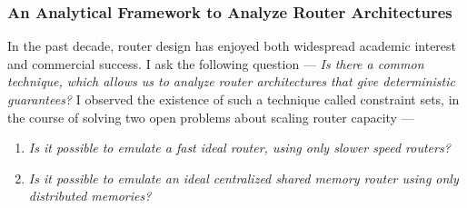 \documentclass[a4paper, 10pt]{article}
\begin{document}
\begin{small}



\subsubsection*{\small An Analytical Framework to Analyze Router Architectures}



In the past decade, router design has enjoyed both widespread academic interest and
commercial success. I ask the following question --- {\em Is there a common
technique, which allows us to analyze router architectures that give deterministic 
guarantees?}
I observed the existence of such a technique called constraint sets, in the course of solving 
two open problems about scaling router capacity ---

\begin{enumerate}

\item {\em Is it possible to emulate a fast ideal router, using only slower speed routers?}

\item {\em Is it possible to emulate an ideal centralized shared memory router using only distributed memories?}

\end{enumerate}



\end{small}
\end{document}

